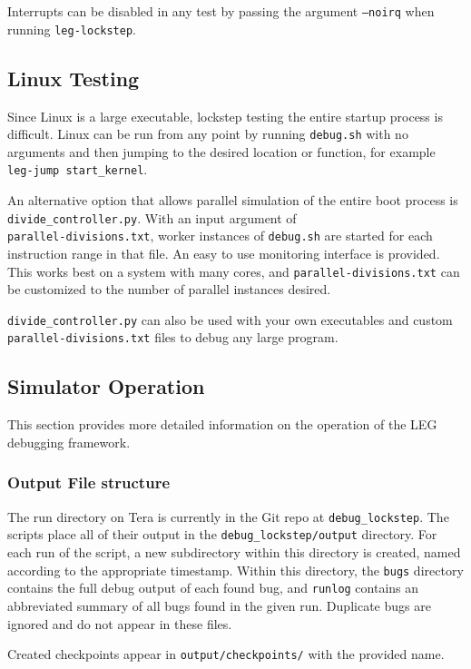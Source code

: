 Interrupts can be disabled in any test by passing the argument \texttt{--noirq} when running \texttt{leg-lockstep}.

\subsection{Linux Testing}
Since Linux is a large executable, lockstep testing the entire startup process is difficult. 
Linux can be run from any point by running \texttt{debug.sh} with no arguments and then jumping to the desired location or function, for example \texttt{leg-jump start\_kernel}.

An alternative option that allows parallel simulation of the entire boot process is \texttt{divide\_controller.py}. 
With an input argument of \\\texttt{parallel-divisions.txt}, worker instances of \texttt{debug.sh} are started for each instruction range in that file. 
An easy to use monitoring interface is provided.
This works best on a system with many cores, and \texttt{parallel-divisions.txt} can be customized to the number of parallel instances desired.

\texttt{divide\_controller.py} can also be used with your own executables and custom \texttt{parallel-divisions.txt} files to debug any large program.

\subsection{Simulator Operation}
This section provides more detailed information on the operation of the LEG debugging framework.

\subsubsection{Output File structure}
The run directory on Tera is currently in the Git repo at \texttt{debug\_lockstep}. The scripts place all of their output in the \texttt{debug\_lockstep/output} directory. For each run of the script, a new subdirectory within this directory is created, named according to the appropriate timestamp. Within this directory, the \texttt{bugs} directory contains the full debug output of each found bug, and \texttt{runlog} contains an abbreviated summary of all bugs found in the given run. Duplicate bugs are ignored and do not appear in these files.

Created checkpoints appear in \texttt{output/checkpoints/} with the provided name.


